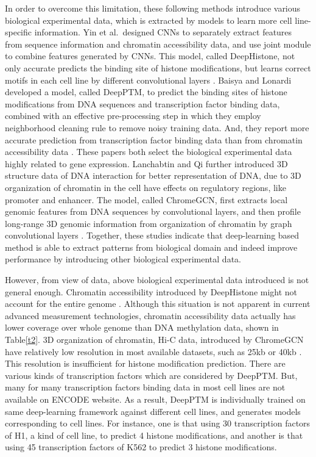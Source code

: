 In order to overcome this limitation, these following methods introduce various biological experimental data, which is extracted by models to learn more cell line-specific information. Yin et al.\ designed CNNs to separately extract features from sequence information and chromatin accessibility data, and use joint module to combine features generated by CNNs. This model, called DeepHistone, not only accurate predicts the binding site of histone modifications, but learns correct motifs in each cell line by different convolutional layers \cite{yin2019deephistone}. Baisya and Lonardi developed a model, called DeepPTM, to predict the binding sites of histone modifications from DNA sequences and transcription factor binding data, combined with an effective pre-processing step in which they employ neighborhood cleaning rule to remove noisy training data. And, they report more accurate prediction from transcription factor binding data than from chromatin accessibility data \cite{baisya2020prediction}. These papers both select the biological experimental data highly related to gene expression. Lanchabtin and Qi further introduced 3D structure data of DNA interaction for better representation of DNA, due to 3D organization of chromatin in the cell have effects on regulatory regions, like promoter and enhancer. The model, called ChromeGCN, first extracts local genomic features from DNA sequences by convolutional layers, and then profile long-range 3D genomic information from organization of chromatin by graph convolutional layers \cite{lanchantin2020graph}.  Together, these studies indicate that deep-learning based method is able to extract patterns from biological domain and indeed improve performance by introducing other biological experimental data.

However, from view of data, above biological experimental data introduced is not general enough. Chromatin accessibility introduced by DeepHistone might not account for the entire genome \cite{yan2016genome}. Although this situation is not apparent in current advanced measurement technologies, chromatin accessibility data actually has lower coverage over whole genome than DNA methylation data, shown in Table\ref{t2}. 3D organization of chromatin, Hi-C data, introduced by ChromeGCN have relatively low resolution in most available datasets, such as 25kb or 40kb \cite{zhang2018enhancing}.  This resolution is insufficient for histone modification prediction. There are various kinds of transcription factors which are considered by DeepPTM. But, many for many transcription factors binding data in most cell lines are not available on ENCODE website. As a result, DeepPTM is individually trained on same deep-learning framework against different cell lines, and generates models corresponding to cell lines. For instance, one is that using 30 transcription factors of H1, a kind of cell line, to predict 4 histone modifications, and another is that using 45 transcription factors of K562 to predict 3 histone modifications.

